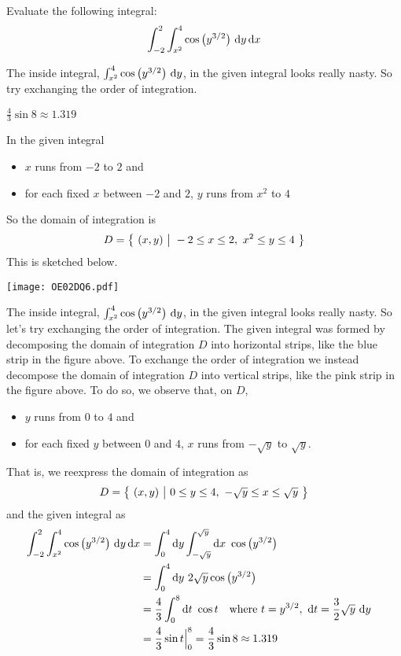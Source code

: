 \begin{question}[M200 2002D] %
Evaluate the following integral:
\begin{equation*}
\int_{-2}^2\int_{x^2}^4\cos\big(y^{3/2}\big)\ \dee{y}\,\dee{x}
\end{equation*}
\end{question}

\begin{hint}
The inside integral, $\int_{x^2}^4\cos\big(y^{3/2}\big)\ \mathrm{d}y$,
in the given integral looks really nasty.  So try exchanging
the order of integration.
\end{hint}

\begin{answer}
$\frac{4}{3}\sin 8\approx 1.319$
\end{answer}

\begin{solution}
In the given integral
\begin{itemize}
\item 
$x$ runs from $-2$ to $2$ and
\item
for each fixed $x$ between $-2$ and $2$, $y$ runs from $x^2$ to $4$
\end{itemize}
So the domain of integration is 
\begin{equation*}
D = \big\{ \ (x,y)\ \big|\ -2\le x\le 2,\  x^2\le y\le 4\ \big\}
\end{equation*}
This is sketched below. 
\begin{center}
     \texttt{[image: OE02DQ6.pdf]}
\end{center}
The inside integral, $\int_{x^2}^4\cos\big(y^{3/2}\big)\ \mathrm{d}y$,
in the given integral looks really nasty.  So let's try exchanging
the order of integration. The given integral was formed by decomposing
the domain of integration $D$ into horizontal strips, like the blue strip
in the figure above. To exchange the order of integration we instead
decompose the domain of integration $D$ into vertical strips, 
like the pink strip in the figure above. To do so, we observe that, on $D$,
\begin{itemize}
\item 
$y$ runs from $0$ to $4$ and
\item
for each fixed $y$ between $0$ and $4$, $x$ runs from $-\sqrt{y}$ to $\sqrt{y}$.
\end{itemize}
That is, we reexpress the domain of integration as 
\begin{equation*}
D = \big\{ \ (x,y)\ \big|\ 0\le y\le 4,\  -\sqrt{y}\le x\le \sqrt{y}\ \big\}
\end{equation*}
and the given integral as
\begin{align*}
\int_{-2}^2\int_{x^2}^4\cos\big(y^{3/2}\big)\ \dee{y}\,\dee{x}
&=\int_0^4\dee{y} \int_{-\sqrt{y}}^{\sqrt{y}}\dee{x}\ \cos\big(y^{3/2}\big)\cr
&=\int_0^4\dee{y} \ 2\sqrt{y}\cos\big(y^{3/2}\big)\cr
&=\frac{4}{3}\int_0^8\dee{t}\ \cos t\quad\hbox{where }
    t=y^{3/2},\ \dee{t}=\frac{3}{2}\sqrt{y}\ \dee{y}\cr
&=\frac{4}{3}\sin t\Big|_0^8
=\frac{4}{3}\sin 8\approx 1.319
\end{align*}
\end{solution}

